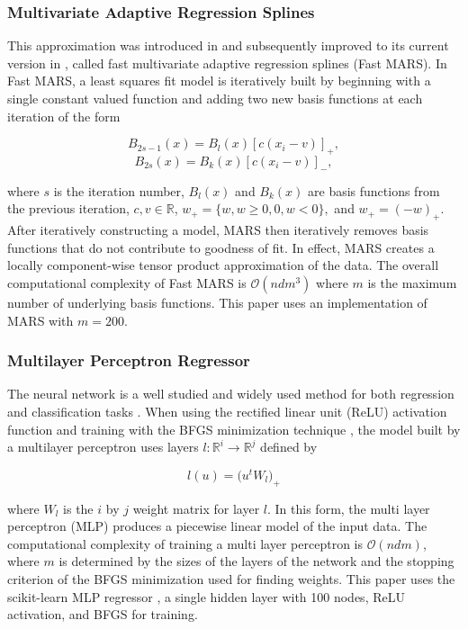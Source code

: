 \documentclass{scspaperproc}
\theoremstyle{scsthe}
\begin{document}
\subsubsection{Multivariate Adaptive Regression Splines}
This approximation was introduced in
 and subsequently improved to its
current version in , called fast
multivariate adaptive regression splines (Fast MARS). In Fast MARS, a
least squares fit model is iteratively built by beginning with a
single constant valued function and adding two new basis functions at
each iteration of the form

$$ B_{2s-1}(x) = B_l(x) [c(x_i-v)]_+ ,$$
$$ B_{2s}(x) = B_k(x) [c(x_i-v)]_- ,$$

where $s$ is the iteration number, $B_l(x)$ and $B_k(x)$ are basis
functions from the previous iteration, $c, v \in \mathbb{R}$, $w_+ =
\{w, w \geq 0, 0, w < 0\},$ and $w_+ = (-w)_+$. After iteratively
constructing a model, MARS then iteratively removes basis functions
that do not contribute to goodness of fit. In effect, MARS creates a
locally component-wise tensor product approximation of the data. The
overall computational complexity of Fast MARS is $\mathcal{O}(n d
m^3)$ where $m$ is the maximum number of underlying basis
functions. This paper uses an implementation of MARS
 with $m = 200$.

\subsubsection{Multilayer Perceptron Regressor}
The neural network is a well studied and widely used method for both
regression and classification tasks
. When using the rectified linear unit
(ReLU) activation function  and training
with the BFGS minimization technique , the
model built by a multilayer perceptron uses layers $l : \mathbb{R}^{i}
\rightarrow \mathbb{R}^{j}$ defined by

$$ l(u) = \big( u^t W_l \big)_+ $$

where $W_l$ is the $i$ by $j$ weight matrix for layer $l$. In this
form, the multi layer perceptron (MLP) produces a piecewise linear
model of the input data. The computational complexity of training a
multi layer perceptron is $\mathcal{O}(n d m)$, where $m$ is
determined by the sizes of the layers of the network and the stopping
criterion of the BFGS minimization used for finding weights. This
paper uses the scikit-learn MLP regressor , a
single hidden layer with 100 nodes, ReLU activation, and BFGS for
training.
\end{document}
